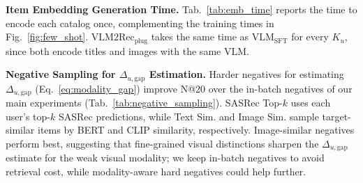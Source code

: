 \begin{table}[t]
\centering
\caption{Item embedding generation time (sec), measured once per catalog.}
\label{tab:emb_time}
\setlength{\tabcolsep}{3pt}
\end{table}

\vspace{+0.1cm}
\noindent\textbf{Item Embedding Generation Time.}
\label{app:emb_time}
Tab.~\ref{tab:emb_time} reports the time to encode each catalog once, complementing the training times in Fig.~\ref{fig:few_shot}.
$\text{VLM2Rec}_{\text{plug}}$ takes the same time as $\text{VLM}_{\text{SFT}}$ for every $K_u$, since both encode titles and images with the same VLM.

\begin{table}[t]

\centering
\caption{Effect of negative sampling strategies for $\Delta_{u,\mathrm{gap}}$ estimation (SASRec, N@20).}
\label{tab:negative_sampling}

\end{table}

\vspace{+0.1cm}
\noindent\textbf{Negative Sampling for $\Delta_{u,\mathrm{gap}}$ Estimation.}
\label{app:negative_sampling}
Harder negatives for estimating $\Delta_{u,\text{gap}}$ (Eq.~\ref{eq:modality_gap}) improve N@20 over the in-batch negatives of our main experiments (Tab.~\ref{tab:negative_sampling}).
SASRec Top-$k$ uses each user's top-$k$ SASRec predictions, while Text Sim. and Image Sim. sample target-similar items by BERT and CLIP similarity, respectively.
Image-similar negatives perform best, suggesting that fine-grained visual distinctions sharpen the $\Delta_{u,\mathrm{gap}}$ estimate for the weak visual modality; we keep in-batch negatives to avoid retrieval cost, while modality-aware hard negatives could help further.

